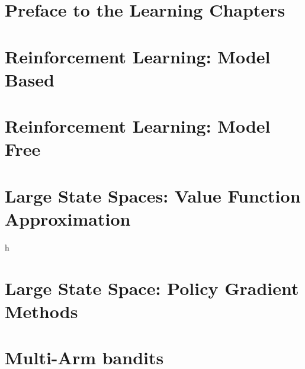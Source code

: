 \documentclass[12pt]{book}
\begin{document}
% 

\chapter{Preface to the Learning Chapters}\label{ym-chapter-learning-preface}


\chapter{Reinforcement Learning: Model Based}\label{chapter-model-based}


\chapter{Reinforcement Learning: Model Free}
\label{chapter:learning-model-free}


\chapter{Large State Spaces: Value Function Approximation}
\label{chapter:function-approximation}


h\chapter{Large State Space: Policy Gradient Methods}
\label{chapter:policy-gradient}


\chapter{ Multi-Arm bandits}
\label{chapter:MAB}


% 

% 
\end{document}
